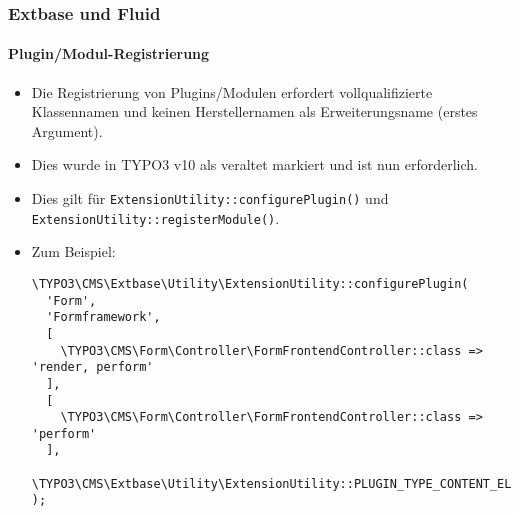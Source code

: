 %

\begin{frame}[fragile]
	\frametitle{Extbase und Fluid}
	\framesubtitle{Plugin/Modul-Registrierung}

	\lstset{basicstyle=\tiny\ttfamily}

	\begin{itemize}
		\item Die Registrierung von Plugins/Modulen erfordert vollqualifizierte Klassennamen
			und keinen Herstellernamen als Erweiterungsname (erstes Argument).
		\item Dies wurde in TYPO3 v10 als veraltet markiert und ist nun erforderlich.
		\item Dies gilt für
			\small\texttt{ExtensionUtility::configurePlugin()}\normalsize
			und
			\small\texttt{ExtensionUtility::registerModule()}.
		\item Zum Beispiel:
\begin{lstlisting}
\TYPO3\CMS\Extbase\Utility\ExtensionUtility::configurePlugin(
  'Form',
  'Formframework',
  [
    \TYPO3\CMS\Form\Controller\FormFrontendController::class => 'render, perform'
  ],
  [
    \TYPO3\CMS\Form\Controller\FormFrontendController::class => 'perform'
  ],
  \TYPO3\CMS\Extbase\Utility\ExtensionUtility::PLUGIN_TYPE_CONTENT_ELEMENT
);
\end{lstlisting}

	\end{itemize}

\end{frame}

